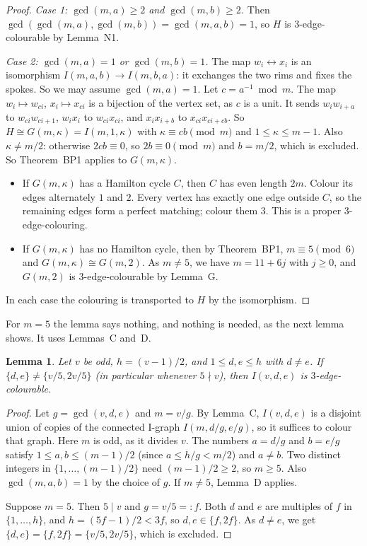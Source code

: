 \documentclass[11pt]{amsart}
\theoremstyle{plain}
\newcommand{\letteredname}{}
\newtheorem*{letteredinner}{Lemma \letteredname}
\newenvironment{lettered}[1]{\renewcommand{\letteredname}{#1}\begin{letteredinner}}{\end{letteredinner}}
\theoremstyle{definition}
\theoremstyle{remark}
\numberwithin{equation}{section}
\begin{document}
\begin{proof}
\emph{Case 1: \(\gcd(m,a)\ge2\) and \(\gcd(m,b)\ge2\).} Then \(\gcd(\gcd(m,a),\gcd(m,b))=\gcd(m,a,b)=1\), so \(H\) is \(3\)-edge-colourable by Lemma~N1.

\emph{Case 2: \(\gcd(m,a)=1\) or \(\gcd(m,b)=1\).} The map \(w_i\leftrightarrow x_i\) is an isomorphism \(I(m,a,b)\to I(m,b,a)\): it exchanges the two rims and fixes the spokes. So we may assume \(\gcd(m,a)=1\). Let \(c=a^{-1}\bmod m\). The map \(w_i\mapsto w_{ci}\), \(x_i\mapsto x_{ci}\) is a bijection of the vertex set, as \(c\) is a unit. It sends \(w_iw_{i+a}\) to \(w_{ci}w_{ci+1}\), \(w_ix_i\) to \(w_{ci}x_{ci}\), and \(x_ix_{i+b}\) to \(x_{ci}x_{ci+cb}\). So \(H\cong G(m,\kappa)=I(m,1,\kappa)\) with \(\kappa\equiv cb\pmod m\) and \(1\le\kappa\le m-1\). Also \(\kappa\ne m/2\): otherwise \(2cb\equiv0\), so \(2b\equiv0\pmod m\) and \(b=m/2\), which is excluded. So Theorem~BP1 applies to \(G(m,\kappa)\).
\begin{itemize}
\item If \(G(m,\kappa)\) has a Hamilton cycle \(C\), then \(C\) has even length \(2m\). Colour its edges alternately \(1\) and \(2\). Every vertex has exactly one edge outside \(C\), so the remaining edges form a perfect matching; colour them \(3\). This is a proper \(3\)-edge-colouring.
\item If \(G(m,\kappa)\) has no Hamilton cycle, then by Theorem~BP1, \(m\equiv5\pmod 6\) and \(G(m,\kappa)\cong G(m,2)\). As \(m\ne5\), we have \(m=11+6j\) with \(j\ge0\), and \(G(m,2)\) is \(3\)-edge-colourable by Lemma~G.
\end{itemize}
In each case the colouring is transported to \(H\) by the isomorphism.
\end{proof}

For \(m=5\) the lemma says nothing, and nothing is needed, as the next lemma shows. It uses Lemmas~C and~D.

\begin{lettered}{D\('\) (which pieces are \(3\)-edge-colourable)}
Let \(v\) be odd, \(h=(v-1)/2\), and \(1\le d,e\le h\) with \(d\ne e\). If \(\{d,e\}\ne\{v/5,2v/5\}\) (in particular whenever \(5\nmid v\)), then \(I(v,d,e)\) is \(3\)-edge-colourable.
\end{lettered}

\begin{proof}
Let \(g=\gcd(v,d,e)\) and \(m=v/g\). By Lemma~C, \(I(v,d,e)\) is a disjoint union of copies of the connected I-graph \(I(m,d/g,e/g)\), so it suffices to colour that graph. Here \(m\) is odd, as it divides \(v\). The numbers \(a=d/g\) and \(b=e/g\) satisfy \(1\le a,b\le(m-1)/2\) (since \(a\le h/g<m/2\)) and \(a\ne b\). Two distinct integers in \(\{1,\dots,(m-1)/2\}\) need \((m-1)/2\ge2\), so \(m\ge5\). Also \(\gcd(m,a,b)=1\) by the choice of \(g\). If \(m\ne5\), Lemma~D applies.

Suppose \(m=5\). Then \(5\mid v\) and \(g=v/5=:f\). Both \(d\) and \(e\) are multiples of \(f\) in \(\{1,\dots,h\}\), and \(h=(5f-1)/2<3f\), so \(d,e\in\{f,2f\}\). As \(d\ne e\), we get \(\{d,e\}=\{f,2f\}=\{v/5,2v/5\}\), which is excluded.
\end{proof}
\end{document}
